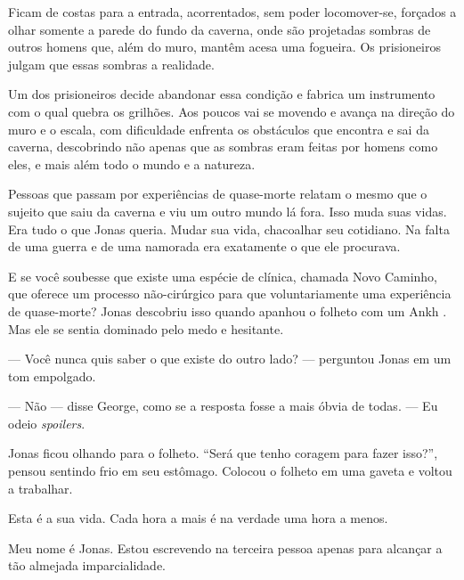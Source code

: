 Ficam de costas para a entrada, acorrentados, sem poder locomover-se, forçados a olhar somente a parede do fundo da caverna, onde são projetadas sombras de outros homens que, além do muro, mantêm acesa uma fogueira. Os prisioneiros julgam que essas sombras  a realidade.

Um dos prisioneiros decide abandonar essa condição e fabrica um instrumento\mudanca{,} com o qual quebra os grilhões. Aos poucos vai se movendo e avança na direção do muro e o escala, com dificuldade enfrenta os obstáculos que encontra e sai da caverna, descobrindo não apenas que as sombras eram feitas por homens como eles, e mais além todo o mundo e a natureza.

Pessoas que passam por experiências de quase-morte relatam o mesmo que o sujeito que saiu da caverna e viu um outro mundo lá fora. Isso muda suas vidas. Era tudo o que Jonas queria. Mudar sua vida, chacoalhar seu cotidiano. Na falta de uma guerra e de uma namorada era exatamente o que ele procurava.

E se você soubesse que existe uma espécie de clínica, chamada Novo Caminho, que oferece um processo não-ci\-rúr\-gi\-co para que  voluntariamente uma experiência de quase-morte? Jonas descobriu isso quando apanhou o folheto com um Ankh . Mas ele se sentia dominado pelo medo e hesitante.

--- Você nunca quis saber o que existe do outro lado? --- perguntou Jonas em um tom empolgado.

--- Não --- disse George, como se a resposta fosse a mais óbvia de todas. --- Eu odeio \emph{spoilers}.

Jonas ficou olhando para o folheto. ``Será que tenho coragem para fazer isso?'', pensou sentindo frio em seu estômago. Colocou o folheto em uma gaveta e voltou a trabalhar.

Esta é a sua vida. Cada hora a mais é na verdade uma hora a menos.

Meu nome é Jonas. Estou escrevendo na terceira pessoa apenas para alcançar a tão almejada imparcialidade.
